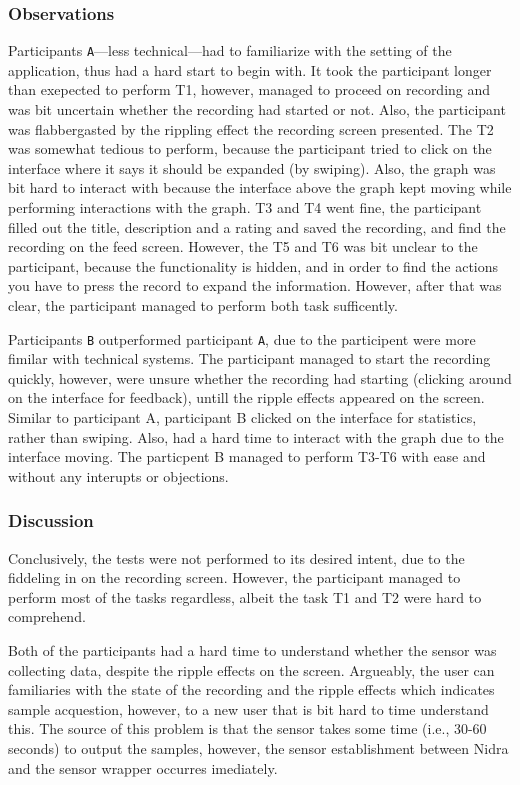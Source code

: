 \subsubsection{Observations}
Participants \verb|A|---less technical---had to familiarize with the setting of the application, thus had a hard start to begin with. It took the participant longer than exepected to perform T1, however, managed to proceed on recording and was bit uncertain whether the recording had started or not. Also, the participant was flabbergasted by the rippling effect the recording screen presented. The T2 was somewhat tedious to perform, because the participant tried to click on the interface where it says it should be expanded (by swiping). Also, the graph was bit hard to interact with because the interface above the graph kept moving while performing interactions with the graph. T3 and T4 went fine, the participant filled out the title, description and a rating and saved the recording, and find the recording on the feed screen. However, the T5 and T6 was bit unclear to the participant, because the functionality is hidden, and in order to find the actions you have to press the record to expand the information. However, after that was clear, the participant managed to perform both task sufficently. 

Participants \verb|B| outperformed participant \verb|A|, due to the participent were more fimilar with technical systems. The participant managed to start the recording quickly, however, were unsure whether the recording had starting (clicking around on the interface for feedback), untill the ripple effects appeared on the screen. Similar to participant A, participant B clicked on the interface for statistics, rather than swiping. Also, had a hard time to interact with the graph due to the interface moving. The particpent B managed to perform T3-T6 with ease and without any interupts or objections. 


\subsubsection{Discussion}

Conclusively, the tests were not performed to its desired intent, due to the fiddeling in on the recording screen. However, the participant managed to perform most of the tasks regardless, albeit the task T1 and T2 were hard to comprehend. 

Both of the participants had a hard time to understand whether the sensor was collecting data, despite the ripple effects on the screen. Argueably, the user can familiaries with the state of the recording and the ripple effects which indicates sample acquestion, however, to a new user that is bit hard to time understand this. The source of this problem is that the sensor takes some time (i.e., 30-60 seconds) to output the samples, however, the sensor establishment between Nidra and the sensor wrapper occurres imediately. 

